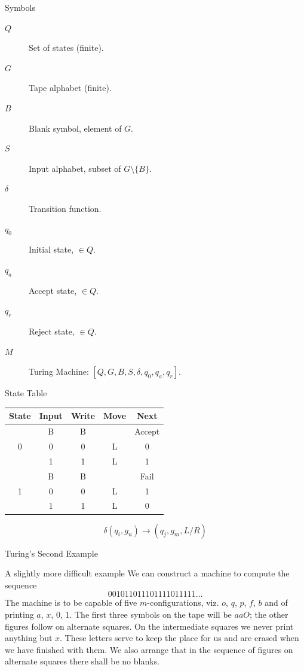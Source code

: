 \begin{frame}{Symbols}
\begin{description}
  \item[$Q$] Set of states (finite).
  \item[$G$] Tape alphabet (finite).
  \item[$B$] Blank symbol, element of $G$.
  \item[$S$] Input alphabet, subset of $G \setminus \{ B \} $.
  \item[$\delta$] Transition function.
  \item[$q_0$] Initial state, $\in Q$.
  \item[$q_a$] Accept state, $\in Q$.
  \item[$q_r$] Reject state, $\in Q$.
  \vspace{0.3cm}
  \item[$M$] Turing Machine: $[ Q, G, B, S, \delta , q_0, q_a, q_r ]$.
\end{description}
\end{frame}

\begin{frame}{State Table}
  \begin{table}
    \centering
    \begin{tabular}{cc|ccc}
      \toprule
      State  & Input  & Write & Move & Next \\
      \midrule
      \multirow{3}{*}{0} 
      & B & B &  & Accept \\
      & 0 & 0 & L & 0 \\
      & 1 & 1 & L & 1 \\
      \midrule
      \multirow{3}{*}{1}
      & B & B &  & Fail \\
      & 0 & 0 & L & 1 \\
      & 1 & 1 & L & 0 \\
      \bottomrule
    \end{tabular}
  \end{table}
  
  \[ \delta(q_i, g_n) \rightarrow (q_j, g_m, L/R) \]
\end{frame}

\begin{frame}{Turing's Second Example}
  \begin{block}{A slightly more difficult example}
    We can construct a machine to compute the sequence
    \[ 001011011101111011111 \ldots \]
    The machine is to be capable of five $m$-configurations, viz. $o$, $q$, $p$, $f$, $b$ and of printing $a$, $x$, $0$, $1$.
    The first three symbols on the tape will be $aaO$; the other figures follow on alternate squares.
    On the intermediate squares we never print anything but $x$.
    These letters serve to keep the place for us and are erased when we have finished with them.
    We also arrange that in the sequence of figures on alternate squares there shall be no blanks.
  \end{block}
\end{frame}

